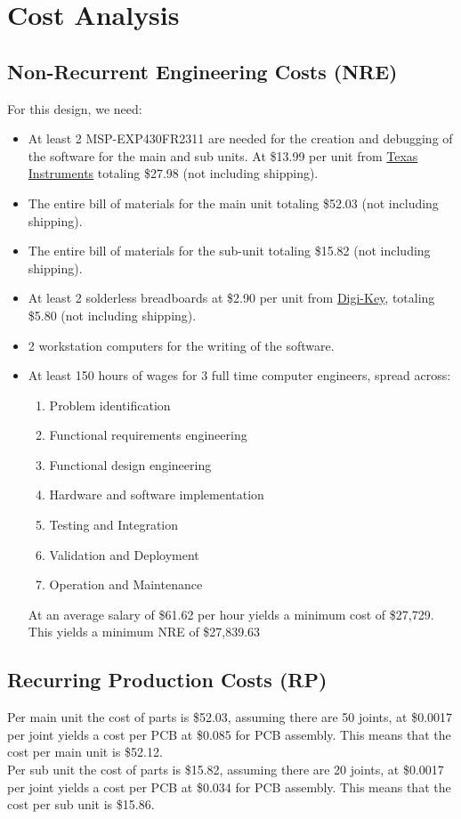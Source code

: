 \section{Cost Analysis}
\subsection{Non-Recurrent Engineering Costs (NRE)}
For this design, we need:

\begin{itemize}
  \item At least 2 MSP-EXP430FR2311 are needed for the creation and debugging of the software for the main and sub units. At \$13.99 per unit from \href{https://www.ti.com/tool/MSP-EXP430FR2311#order-start-development}{Texas Instruments} totaling \$27.98 (not including shipping).
  \item The entire bill of materials for the main unit totaling \$52.03 (not including shipping).
  \item The entire bill of materials for the sub-unit totaling \$15.82 (not including shipping).
  \item At least 2 solderless breadboards at \$2.90 per unit from \href{https://www.digikey.com/en/products/detail/dfrobot/FIT0096/7597069}{Digi-Key}, totaling \$5.80 (not including shipping).
  \item 2 workstation computers for the writing of the software.
  \item At least 150 hours of wages for 3 full time computer engineers, spread across:
        \begin{enumerate}
          \item Problem identification
          \item Functional requirements engineering
          \item Functional design engineering
          \item Hardware and software implementation
          \item Testing and Integration
          \item Validation and Deployment
          \item Operation and Maintenance
        \end{enumerate}
At an average salary of \$61.62 per hour \cite{ComputerHardwareEngineers} yields a minimum cost of \$27,729.
This yields a minimum NRE of \$27,839.63
\end{itemize}
\subsection{Recurring Production Costs (RP)}
Per main unit the cost of parts is \$52.03, assuming there are 50 joints, at \$0.0017 per joint yields a cost per PCB at \$0.085 for PCB assembly. This means that the cost per main unit is \$52.12.\\
Per sub unit the cost of parts is \$15.82, assuming there are 20 joints, at \$0.0017 per joint yields a cost per PCB at \$0.034 for PCB assembly. This means that the cost per sub unit is \$15.86.\\
